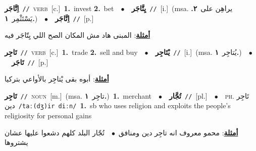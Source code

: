 \documentclass[10pt,a4paper,twoside]{article} %
\begin{document}
\begin{multicols}{2}
{{{\setlength\topsep{0pt}\textbf{\foreignlanguage{arabic}{اِتَّاجَر}}\ {\color{gray}\texttt{//}\color{black}}\ \textsc{verb}\ [c.]\ \textbf{1.}~invest  \textbf{2.}~bet\ \ $\bullet$\ \ \setlength\topsep{0pt}\textbf{\foreignlanguage{arabic}{يِتَّاجَر}}\ {\color{gray}\texttt{//}\color{black}}\ [i.]\ \color{gray}(msa. \foreignlanguage{arabic}{يراهِن على}~\foreignlanguage{arabic}{\textbf{٢.}}  \foreignlanguage{arabic}{يَسْتَثْمِر}~\foreignlanguage{arabic}{\textbf{١.}})\color{black}\ \ $\bullet$\ \ \setlength\topsep{0pt}\textbf{\foreignlanguage{arabic}{اِتَّاجَر}}\ {\color{gray}\texttt{//}\color{black}}\ [p.]\  \begin{flushright}\color{gray}\foreignlanguage{arabic}{\textbf{\underline{\foreignlanguage{arabic}{أمثلة}}}: المبنى هاد مش المكان الصح اللي يِتّاجَر فيه}\end{flushright}\color{black}} \vspace{2mm}

{\setlength\topsep{0pt}\textbf{\foreignlanguage{arabic}{تَاجِر}}\ {\color{gray}\texttt{//}\color{black}}\ \textsc{verb}\ [c.]\ \textbf{1.}~trade  \textbf{2.}~sell and buy\ \ $\bullet$\ \ \setlength\topsep{0pt}\textbf{\foreignlanguage{arabic}{يْتَاجِر}}\ {\color{gray}\texttt{//}\color{black}}\ [i.]\ \color{gray}(msa. \foreignlanguage{arabic}{يُتاجِر}~\foreignlanguage{arabic}{\textbf{١.}})\color{black}\ \ $\bullet$\ \ \setlength\topsep{0pt}\textbf{\foreignlanguage{arabic}{تَاجَر}}\ {\color{gray}\texttt{//}\color{black}}\ [p.]\  \begin{flushright}\color{gray}\foreignlanguage{arabic}{\textbf{\underline{\foreignlanguage{arabic}{أمثلة}}}: أبوه بقى يْتاجِر بالأواعي بتركيا}\end{flushright}\color{black}} \vspace{2mm}

{\setlength\topsep{0pt}\textbf{\foreignlanguage{arabic}{تَاجِر}}\ {\color{gray}\texttt{//}\color{black}}\ \textsc{noun}\ [m.]\ \color{gray}(msa. \foreignlanguage{arabic}{تاجِر}~\foreignlanguage{arabic}{\textbf{١.}})\color{black}\ \textbf{1.}~merchant\ \ $\bullet$\ \ \setlength\topsep{0pt}\textbf{\foreignlanguage{arabic}{تُجَّار}}\ {\color{gray}\texttt{//}\color{black}}\ [pl.]\ \ $\bullet$\ \ \textsc{ph.} \color{gray} \foreignlanguage{arabic}{تَاجِر دين}\color{black}\ {\color{gray}\texttt{/{\sffamily taː(dʒ)ir diːn}/}\color{black}}\ \textbf{1.}~sb who uses religion and exploits the people's religiosity for personal gains\  \begin{flushright}\color{gray}\foreignlanguage{arabic}{\textbf{\underline{\foreignlanguage{arabic}{أمثلة}}}: محمو معروف انه تاجِر دين ومنافق\ $\bullet$\ \  تُجّار البلد كلهم دشعوا عليها عشان يشتروها}\end{flushright}\color{black}} \vspace{2mm}

}}
\end{multicols}
\end{document}
